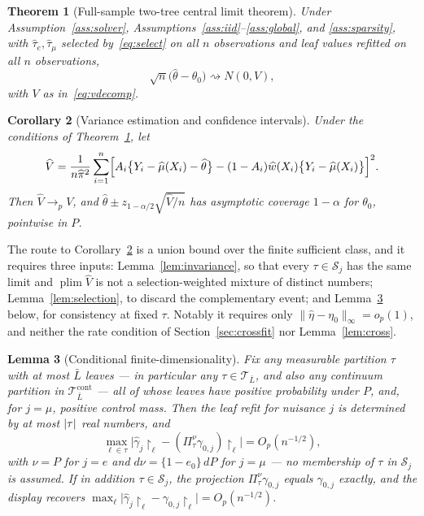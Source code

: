 \documentclass[11pt]{article}
\theoremstyle{plain}
\newtheorem{theorem}{Theorem}[section]
\newtheorem{lemma}[theorem]{Lemma}
\newtheorem{corollary}[theorem]{Corollary}
\theoremstyle{definition}
\theoremstyle{remark}
\newcommand{\cT}{\mathcal{T}}
\newcommand{\cS}{\mathcal{S}}
\newcommand{\ez}{e_0}
\newcommand{\mhat}{\widehat{\mu}}
\newcommand{\what}{\widehat{w}}
\newcommand{\that}{\widehat{\tau}}
\newcommand{\thetahat}{\widehat{\theta}}
\newcommand{\pihat}{\widehat{\pi}}
\newcommand{\Vhat}{\widehat{V}}
\newcommand{\Linf}[1]{\lVert #1 \rVert_{\infty}}
\DeclareMathOperator{\plim}{plim}
\DeclarePairedDelimiter{\card}{\lvert}{\rvert}
\newcommand{\cTcont}{\cT^{\mathrm{cont}}_{\bar L}}
\begin{document}
\begin{theorem}[Full-sample two-tree central limit theorem]\label{thm:main}
Under Assumption~\ref{ass:solver}, Assumptions~\ref{ass:iid}--\ref{ass:global},
and \ref{ass:sparsity}, with
$\that_e,\that_\mu$ selected by~\eqref{eq:select} on all $n$ observations and
leaf values refitted on all $n$ observations,
\[
  \sqrt n\bigl(\thetahat-\theta_0\bigr)\rightsquigarrow N(0,V),
\]
with $V$ as in~\eqref{eq:vdecomp}.
\end{theorem}

\begin{corollary}[Variance estimation and confidence intervals]
\label{cor:variance}
Under the conditions of Theorem~\ref{thm:main}, let
\begin{equation}\label{eq:vhat}
  \Vhat=\frac1{n\pihat^2}\sum_{i=1}^n
  \Bigl[A_i\bigl\{Y_i-\mhat(X_i)-\thetahat\bigr\}
   -(1-A_i)\what(X_i)\bigl\{Y_i-\mhat(X_i)\bigr\}\Bigr]^2 .
\end{equation}
Then $\Vhat\to_pV$, and $\thetahat\pm z_{1-\alpha/2}\sqrt{\Vhat/n}$ has
asymptotic coverage $1-\alpha$ for $\theta_0$, pointwise in $P$.
\end{corollary}

\noindent The route to Corollary~\ref{cor:variance} is a union bound over the
finite sufficient class, and it requires three inputs:
Lemma~\ref{lem:invariance}, so that every $\tau\in\cS_j$ has the same limit and
$\plim\Vhat$ is not a selection-weighted mixture of distinct numbers;
Lemma~\ref{lem:selection}, to discard the complementary event; and
Lemma~\ref{lem:findim} below, for consistency at fixed $\tau$. Notably it
requires only $\Linf{\widehat\eta-\eta_0}=o_p(1)$, and neither the rate
condition of Section~\ref{sec:crossfit} nor Lemma~\ref{lem:cross}.

\begin{lemma}[Conditional finite-dimensionality]\label{lem:findim}
Fix any measurable partition $\tau$ with at most $\bar L$ leaves --- in
particular any $\tau\in\cT_{\bar L}$, and also any continuum partition in
$\cTcont$ --- all of whose leaves have positive probability under
$P$, and, for $j=\mu$, positive control mass. Then the leaf refit for nuisance
$j$ is determined by at most $\card\tau$ real numbers, and
\[
  \max_{\ell\in\tau}
  \bigl\lvert\widehat\gamma_{j}\restriction_\ell
   -(\Pi^\nu_\tau\gamma_{0,j})\restriction_\ell\bigr\rvert=O_p(n^{-1/2}),
\]
with $\nu=P$ for $j=e$ and $d\nu=\{1-\ez\}\,dP$ for $j=\mu$ --- no
membership of $\tau$ in $\cS_j$ is assumed. If in addition $\tau\in\cS_j$,
the projection $\Pi^\nu_\tau\gamma_{0,j}$ equals $\gamma_{0,j}$ exactly, and
the display recovers
$\max_\ell\lvert\widehat\gamma_j\restriction_\ell-\gamma_{0,j}\restriction_\ell\rvert=O_p(n^{-1/2})$.
\end{lemma}
\end{document}
